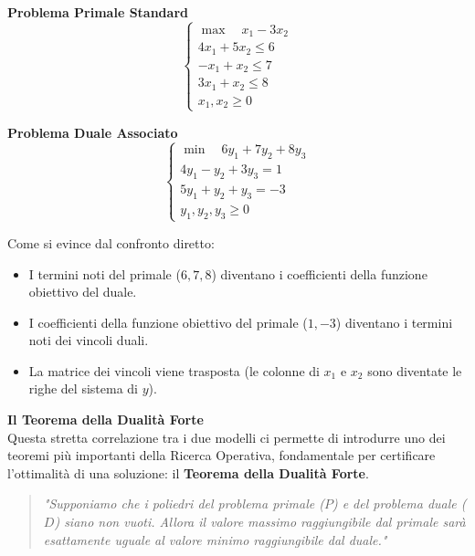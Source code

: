 \documentclass[12pt, a4paper]{article}
\newcommand{\separatore}{\noindent{\color{titlecolor!50}\rule{\textwidth}{0.6pt}}}
\begin{document}
	\vspace{0.4cm}
	\noindent
	\begin{minipage}[t]{0.48\textwidth}
		\centering
		\textbf{Problema Primale Standard}
		\[
		\begin{cases}
			\max \quad x_1 - 3x_2 \\[6pt]
			4x_1 + 5x_2 \leq 6 \\
			-x_1 + x_2 \leq 7 \\
			3x_1 + x_2 \leq 8 \\[6pt]
			x_1, x_2 \geq 0
		\end{cases}
		\]
	\end{minipage}%
	\hfill%
	\begin{minipage}[t]{0.48\textwidth}
		\centering
		\textbf{Problema Duale Associato}
		\[
		\begin{cases}
			\min \quad 6y_1 + 7y_2 + 8y_3 \\[6pt]
			4y_1 - y_2 + 3y_3 = 1 \\
			5y_1 + y_2 + y_3 = -3 \\[6pt]
			y_1, y_2, y_3 \geq 0
		\end{cases}
		\]
	\end{minipage}
	
	\vspace{0.6cm}
	Come si evince dal confronto diretto:
	\begin{itemize}[label=$\circ$, itemsep=2pt, leftmargin=1.5cm]
		\item I termini noti del primale ($6, 7, 8$) diventano i coefficienti della funzione obiettivo del duale.
		\item I coefficienti della funzione obiettivo del primale ($1, -3$) diventano i termini noti dei vincoli duali.
		\item La matrice dei vincoli viene trasposta (le colonne di $x_1$ e $x_2$ sono diventate le righe del sistema di $y$).
	\end{itemize}
	
	\vspace{0.6cm}
	\separatore
	\vspace{0.4cm}
	
	\textbf{Il Teorema della Dualità Forte}\\
	Questa stretta correlazione tra i due modelli ci permette di introdurre uno dei teoremi più importanti della Ricerca Operativa, fondamentale per certificare l'ottimalità di una soluzione: il \textbf{Teorema della Dualità Forte}.
	
	\begin{quote}
		\textit{"Supponiamo che i poliedri del problema primale ($P$) e del problema duale ($D$) siano non vuoti. Allora il valore massimo raggiungibile dal primale sarà esattamente uguale al valore minimo raggiungibile dal duale."}
	\end{quote}
	
\end{document}

